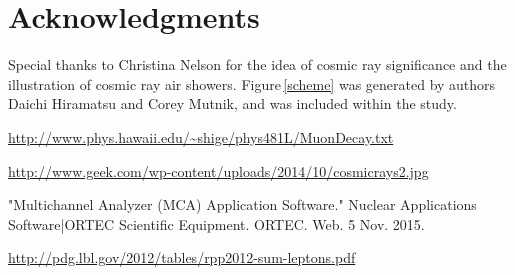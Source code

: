 \documentclass[aps,prl,twocolumn,superscriptaddress,nofootinbib]{revtex4-1}
\begin{document}
\section{Acknowledgments}
Special thanks to Christina Nelson for the idea of cosmic ray significance and the illustration of cosmic ray air showers. Figure\,\ref{scheme} was generated by authors Daichi Hiramatsu and Corey Mutnik, and was included within the study.

\setlength{\parindent}{0cm}

\begin{thebibliography}{99}  %

 \url{http://www.phys.hawaii.edu/~shige/phys481L/MuonDecay.txt}    %

 \url{http://www.geek.com/wp-content/uploads/2014/10/cosmicrays2.jpg}

 "Multichannel Analyzer (MCA) Application Software." Nuclear Applications Software|ORTEC Scientific Equipment. ORTEC. Web. 5 Nov. 2015.

 \url{http://pdg.lbl.gov/2012/tables/rpp2012-sum-leptons.pdf}




\end{thebibliography}
\end{document}
